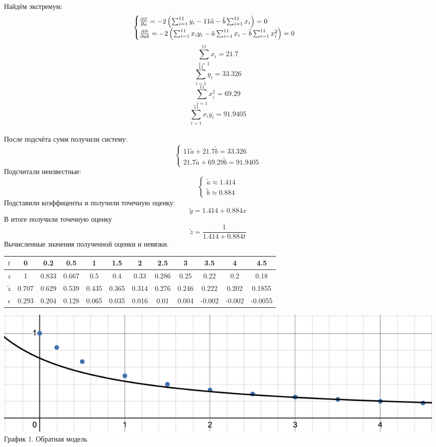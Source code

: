 \documentclass{article}
\begin{document}
Найдём экстремум:
\[\begin{cases}
    \pdv{S}{a} = -2\left(\sum_{i=1}^{11}y_i - 11\tilde{a} - \tilde{b}\sum_{i=1}^{11}x_i\right) = 0\\
    \pdv{S}{ab} = -2\left(\sum_{i=1}^{11}x_iy_i - \tilde{a}\sum_{i=1}^{11}x_i - \tilde{b}\sum_{i=1}^{11}x_i^2\right) = 0
\end{cases}\]
\[\sum_{i=1}^{11}x_i = 21.7\]
\[\sum_{i=1}^{11}y_i = 33.326\]
\[\sum_{i=1}^{11}x_i^2 = 69.29\]
\[\sum_{i=1}^{11}x_iy_i = 91.9405\]
\\
После подсчёта сумм получили систему:
\[\begin{cases}
    11\tilde{a} + 21.7\tilde{b} = 33.326\\
    21.7\tilde{a} + 69.29\tilde{b} = 91.9405
\end{cases}\]
Подсчитали неизвестные:
\[\begin{cases}
    \tilde{a}  \approx 1.414\\
    \tilde{b}  \approx 0.884
\end{cases}\]
Подставили коэффиценты и получили точечную оценку:
\[\tilde{y} = 1.414+0.884x\]
В итоге получили точечную оценку
\[\tilde{z} = \frac{1}{1.414 + 0.884t}\]
Вычисленные значения полученной оценки и невязки.
\begin{table}[H]
    \centering
    \begin{tabular}{|c|*{11}{c|}}
        \hline
        \(t\) & 0 & 0.2 & 0.5 & 1 & 1.5 & 2 & 2.5 & 3 & 3.5 & 4 & 4.5 \\
        \hline
        \(z\) &1&0.833&0.667 & 0.5& 0.4& 0.33& 0.286& 0.25& 0.22& 0.2& 0.18 \\
        \hline
        \(\tilde{z}\) & 0.707 & 0.629 & 0.539 & 0.435 & 0.365& 0.314& 0.276 & 0.246 & 0.222 & 0.202 & 0.1855 \\
        \hline
        \(\epsilon\) & 0.293 & 0.204 & 0.128 & 0.065 & 0.035& 0.016 & 0.01 & 0.004 & -0.002 & -0.002 & -0.0055 \\
        \hline
    \end{tabular}
\end{table}
\begin{center}
    \includegraphics[width=.9\textwidth]{inv.png}\\
    График 1. Обратная модель
\end{center}
\end{document}
